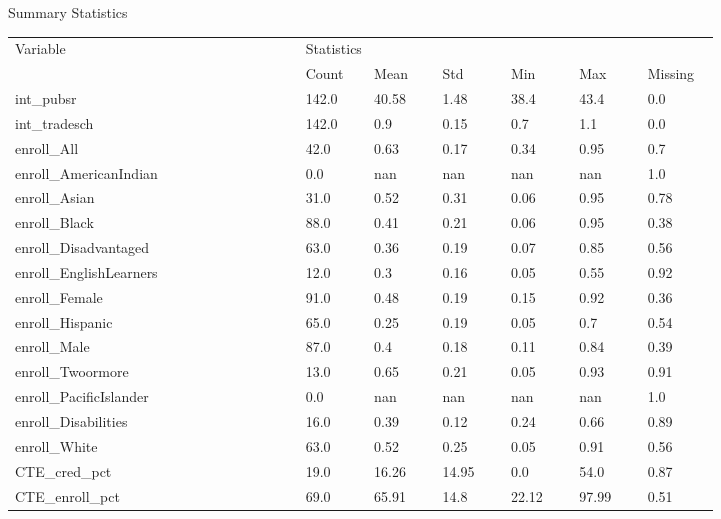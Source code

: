 \begin{threeparttable}
    \caption{Summary Statistics} %
\label{tab:summarystats2} %
    \begin{tabular}{ p{0.34\linewidth} p{0.08\linewidth} p{0.08\linewidth} p{0.08\linewidth} p{0.08\linewidth} p{0.08\linewidth} p{0.08\linewidth}}     %
    \toprule %
    Variable                        & \multicolumn{6}{l}{Statistics} \\ %

                       \cmidrule(r){2-7} %
                                    &    Count   &   Mean & Std & Min & Max & Missing  \\ 
\midrule 
 int\_pubsr &  142.0  &  40.58 & 1.48 & 38.4 & 43.4 & 0.0  \\ 
 int\_tradesch &  142.0  &  0.9 & 0.15 & 0.7 & 1.1 & 0.0  \\ 
 enroll\_All &  42.0  &  0.63 & 0.17 & 0.34 & 0.95 & 0.7  \\ 
 enroll\_AmericanIndian &  0.0  &  nan & nan & nan & nan & 1.0  \\ 
 enroll\_Asian &  31.0  &  0.52 & 0.31 & 0.06 & 0.95 & 0.78  \\ 
 enroll\_Black &  88.0  &  0.41 & 0.21 & 0.06 & 0.95 & 0.38  \\ 
 enroll\_Disadvantaged &  63.0  &  0.36 & 0.19 & 0.07 & 0.85 & 0.56  \\ 
 enroll\_EnglishLearners &  12.0  &  0.3 & 0.16 & 0.05 & 0.55 & 0.92  \\ 
 enroll\_Female &  91.0  &  0.48 & 0.19 & 0.15 & 0.92 & 0.36  \\ 
 enroll\_Hispanic &  65.0  &  0.25 & 0.19 & 0.05 & 0.7 & 0.54  \\ 
 enroll\_Male &  87.0  &  0.4 & 0.18 & 0.11 & 0.84 & 0.39  \\ 
 enroll\_Twoormore &  13.0  &  0.65 & 0.21 & 0.05 & 0.93 & 0.91  \\ 
 enroll\_PacificIslander &  0.0  &  nan & nan & nan & nan & 1.0  \\ 
 enroll\_Disabilities &  16.0  &  0.39 & 0.12 & 0.24 & 0.66 & 0.89  \\ 
 enroll\_White &  63.0  &  0.52 & 0.25 & 0.05 & 0.91 & 0.56  \\ 
 CTE\_cred\_pct &  19.0  &  16.26 & 14.95 & 0.0 & 54.0 & 0.87  \\ 
 CTE\_enroll\_pct &  69.0  &  65.91 & 14.8 & 22.12 & 97.99 & 0.51  \\ 
\midrule
\end{tabular}

\end{threeparttable}


